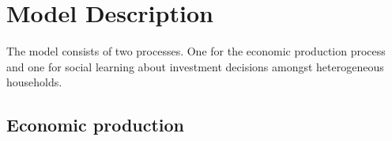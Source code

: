 \section{Model Description}
\label{sec:Model_Description}
\par

The model consists of two processes. One for the economic production process and one for social learning about investment decisions amongst heterogeneous households.

\subsection{Economic production}
\label{sec:model_description}

